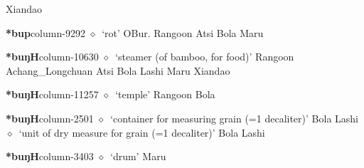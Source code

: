          Xiandao 
  \item {\footnotesize \textbf{*bup}}{\tiny column-9292}
         $\diamond$~`rot'
         OBur. 
\hspace{1ex}
         Rangoon 
\hspace{1ex}
         Atsi 
\hspace{1ex}
         Bola 
\hspace{1ex}
         Maru 
  \item {\footnotesize \textbf{*buŋH}}{\tiny column-10630}
         $\diamond$~`steamer (of bamboo, for food)'
         Rangoon 
\hspace{1ex}
         Achang\_Longchuan 
\hspace{1ex}
         Atsi 
\hspace{1ex}
         Bola 
\hspace{1ex}
         Lashi 
\hspace{1ex}
         Maru 
\hspace{1ex}
         Xiandao 
  \item {\footnotesize \textbf{*buŋH}}{\tiny column-11257}
         $\diamond$~`temple'
         Rangoon 
\hspace{1ex}
         Bola 
  \item {\footnotesize \textbf{*buŋH}}{\tiny column-2501}
         $\diamond$~`container for measuring grain (=1 decaliter)'
         Bola 
\hspace{1ex}
         Lashi 
\hspace{1ex}
         $\diamond$~`unit of dry measure for grain (=1 decaliter)'
         Bola 
\hspace{1ex}
         Lashi 
  \item {\footnotesize \textbf{*buŋH}}{\tiny column-3403}
         $\diamond$~`drum'
         Maru 
\hspace{1ex}
